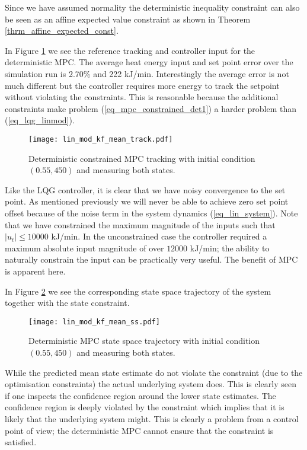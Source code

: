 Since we have assumed normality the deterministic inequality constraint can also be seen as an affine expected value constraint as shown in Theorem \ref{thrm_affine_expected_const}.

In Figure \ref{fig_lin_mod_kf_mean_track} we see the reference tracking and controller input for the deterministic MPC. The average heat energy input and set point error over the simulation run is 2.70\% and 222 kJ/min. Interestingly the average error is not much different but the controller requires more energy to track the setpoint without violating the constraints. This is reasonable because the additional constraints make problem (\ref{eq_mpc_constrained_det1}) a harder problem than (\ref{eq_lqg_linmod}).
\begin{figure}[H] 
\centering
\texttt{[image: lin\_mod\_kf\_mean\_track.pdf]}
\caption{Deterministic constrained MPC tracking with initial condition $(0.55, 450)$ and measuring both states.}
\label{fig_lin_mod_kf_mean_track}
\end{figure}
Like the LQG controller, it is clear that we have noisy convergence to the set point. As mentioned previously we will never be able to achieve zero set point offset because of the noise term in the system dynamics (\ref{eq_lin_system}). Note that we have constrained the maximum magnitude of the inputs such that $|u_t| \leq 10000$ kJ/min. In the unconstrained case the controller required a maximum absolute input magnitude of over $12000$ kJ/min; the ability to naturally constrain the input can be practically very useful. The benefit of MPC is apparent here.

In Figure \ref{fig_lin_mod_kf_mean_ss} we see the corresponding state space trajectory of the system together with the state constraint.
\begin{figure}[H] 
\centering
\texttt{[image: lin\_mod\_kf\_mean\_ss.pdf]}
\caption{Deterministic MPC state space trajectory with initial condition $(0.55, 450)$ and measuring both states.}
\label{fig_lin_mod_kf_mean_ss}
\end{figure}
While the predicted mean state estimate do not violate the constraint (due to the optimisation constraints) the actual underlying system does.  This is clearly seen if one inspects the confidence region around the lower state estimates. The confidence region is deeply violated by the constraint which implies that it is likely that the underlying system might. This is clearly a problem from a control point of view; the deterministic MPC cannot ensure that the constraint is satisfied.

